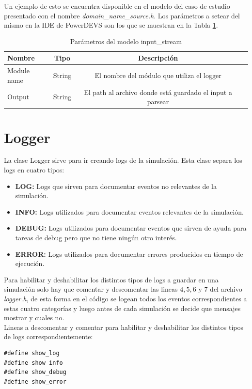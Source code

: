 \documentclass[10pt,a4paper]{article}
\begin{document}
Un ejemplo de esto se encuentra disponible en el modelo del caso de estudio presentado con el nombre \textit{domain\_name\_source.h}. Los parámetros a setear del mismo en la IDE de PowerDEVS son los que se muestran en la Tabla \ref{table: output stream parameters}.
\begin{table}[h]
\begin{tabular}{|l|c|c|c|}
  \hline
  \textbf{Nombre} & \textbf{Tipo} & \textbf{Descripción} \\
  \hline
  Module name & String & El nombre del módulo que utiliza el logger \\
  \hline
  Output & String & El path al archivo donde está guardado el input a parsear \\
  \hline
\end{tabular}
\caption{Parámetros del modelo input\_stream}
\label{table: output stream parameters}
\end{table}

\newpage

\section{Logger}

La clase Logger sirve para ir creando logs de la simulación. Esta clase separa los logs en cuatro tipos:

\begin{itemize}
\item \textbf{LOG:} Logs que sirven para documentar eventos no relevantes de la simulación.
\item \textbf{INFO:} Logs utilizados para documentar eventos relevantes de la simulación.
\item \textbf{DEBUG:} Logs utilizados para documentar eventos que sirven de ayuda para tareas de debug pero que no tiene ningún otro interés.
\item \textbf{ERROR:} Logs utilizados para documentar errores producidos en tiempo de ejecución.
\end{itemize}

Para habilitar y deshabilitar los distintos tipos de logs a guardar en una simulación solo hay que comentar y descomentar las lineas $4,5,6$ y $7$ del archivo \textit{logger.h}, de esta forma en el código se logean todos los eventos correspondientes a estas cuatro categorías y luego antes de cada simulación se decide que mensajes mostrar y cuales no. \\

Lineas a descomentar y comentar para habilitar y deshabilitar los distintos tipos de logs correspondientemente:
\begin{lstlisting}
#define show_log
#define show_info
#define show_debug
#define show_error
\end{lstlisting}
\end{document}
